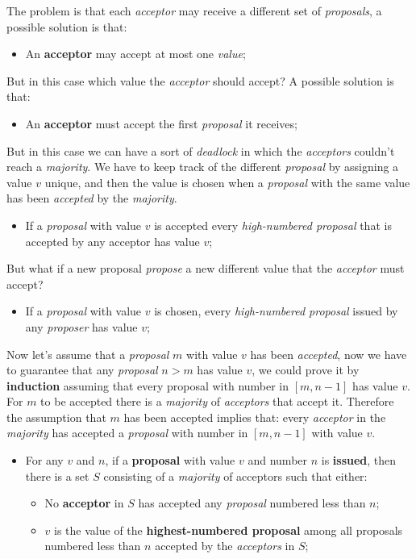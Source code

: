 \documentclass{article}
\begin{document}
\hfill \break
The problem is that each \emph{acceptor} may receive a different set of \emph{proposals}, a possible solution is that:
\begin{itemize}
\item An \textbf{acceptor} may accept at most one \emph{value};
\end{itemize}
But in this case which value the \emph{acceptor} should accept? A possible solution is that:
\begin{itemize}
\item An \textbf{acceptor} must accept the first \emph{proposal} it receives;
\end{itemize}
But in this case we can have a sort of \emph{deadlock} in which the \emph{acceptors} couldn't reach a \emph{majority}. We have to keep track of the different \emph{proposal} by assigning a value $v$ unique, and then the value is chosen when a \emph{proposal} with the same value has been \emph{accepted} by the \emph{majority}. 
\begin{itemize}
\item If a \emph{proposal} with value $v$ is accepted every \emph{high-numbered proposal} that is accepted by any acceptor has value $v$;
\end{itemize}
But what if a new proposal \emph{propose} a new different value that the \emph{acceptor} must accept? 
\begin{itemize}
\item If a \emph{proposal} with value $v$ is chosen, every \emph{high-numbered proposal} issued by any \emph{proposer} has value $v$;
\end{itemize}
Now let's assume that a \emph{proposal} $m$ with value $v$ has been \emph{accepted}, now we have to guarantee that any \emph{proposal} $n>m$ has value $v$, we could prove it by \textbf{induction} assuming that every proposal with number in $\left [m,n-1\right]$ has value $v$. For $m$ to be accepted there is a \emph{majority} of \emph{acceptors} that accept it. Therefore the assumption that $m$ has been accepted implies that: every \emph{acceptor} in the \emph{majority} has accepted a \emph{proposal} with number in $\left [m,n-1\right ]$ with value $v$.
\begin{itemize}
\item For any $v$ and $n$, if a \textbf{proposal} with value $v$ and number $n$ is \textbf{issued}, then there is a set $S$ consisting of a \emph{majority} of acceptors such that either:
\begin{itemize}
\item No \textbf{acceptor} in $S$ has accepted any \emph{proposal} numbered less than $n$;
\item $v$ is the value of the \textbf{highest-numbered proposal} among all proposals numbered less than $n$ accepted by the \emph{acceptors} in $S$;
\end{itemize}
\end{itemize}
\end{document}
